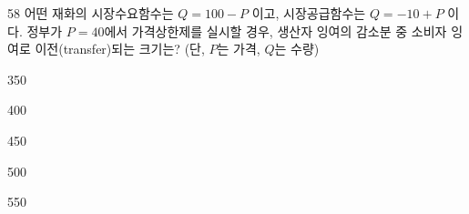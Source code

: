 \begin{question}{58}
어떤 재화의 시장수요함수는 $Q=100-P$ 이고, 시장공급함수는 $Q=-10+P$ 이다. 정부가 $P=40$에서 가격상한제를 실시할 경우, 생산자 잉여의 감소분 중 소비자 잉여로 이전(transfer)되는 크기는? (단, $P$는 가격, $Q$는 수량)
\begin{choices}
  \item 350
  \item 400
  \item 450
  \item 500
  \item 550
\end{choices}
\end{question}

